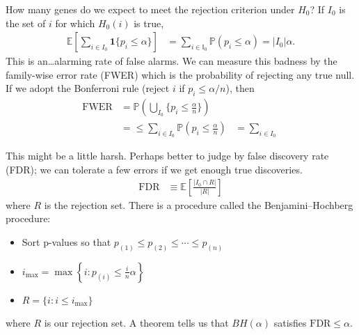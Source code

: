 \documentclass[11pt,letterpaper]{article}
\theoremstyle{definition}
\numberwithin{equation}{section}
\numberwithin{figure}{section}
\begin{document}
How many genes do we expect to meet the rejection criterion under $H_0$? If $I_0$ is the set of $i$ for which $H_0(i)$ is true,
%
\begin{align}
	\mathbb{E}\left[\sum_{i\in I_0} \bm{1}\{p_i \leq \alpha\}\right] &= \sum_{i \in \mathbb{I}_0} \mathbb{P}(p_i \leq \alpha) = |I_0| \alpha.
\end{align}
%
This is an\ldots alarming rate of false alarms. We can measure this badness by the family-wise error rate (FWER) which is the probability of rejecting any true null. If we adopt the Bonferroni rule (reject $i$ if $p_i \leq \alpha/n$), then
%
\begin{align}
	\mathrm{FWER} &= \mathbb{P}\left(\bigcup_{I_0} \{p_i \leq \frac{\alpha}{n}\}\right)\\
	&= \leq \sum_{i \in I_0} \mathbb{P}\left(p_i \leq \frac{\alpha}{n}\right)
	&= \sum_{i \in I_0} \frac{}{}
\end{align}




This might be a little harsh. Perhaps better to judge by false discovery rate (FDR); we can tolerate a few errors if we get enough true discoveries.
%
\begin{align}
	\mathrm{FDR} &\equiv \mathbb{E}\left[\frac{|I_0 \cap R|}{|R|}\right]
\end{align}
%
where $R$ is the rejection set. There is a procedure called the Benjamini--Hochberg procedure:
%
\begin{itemize}
	\item Sort p-values so that $p_{(1)} \leq p_{(2)} \leq \cdots \leq p_{(n)}$
	\item $i_\mathrm{max} = \max\left\{i : p_{(i)} \leq \frac{i}{n} \alpha\right\}$
	\item $R = \{i: i \leq i_\mathrm{max}\}$
\end{itemize}
%
where $R$ is our rejection set. A theorem tells us that $BH(\alpha)$ satisfies $\mathrm{FDR} \leq \alpha$.
\end{document}

